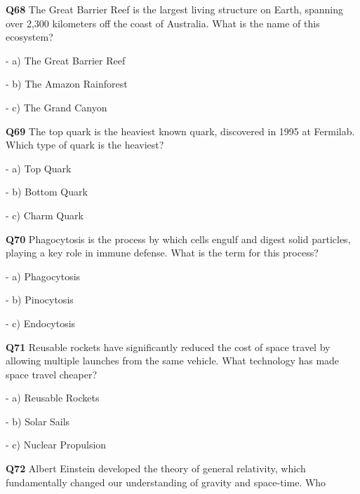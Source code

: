\textbf{Q68} The Great Barrier Reef is the largest living structure on Earth, spanning over 2,300 kilometers off the coast of Australia. What is the name of this ecosystem?\par
\quad - a) The Great Barrier Reef\par
\quad - b) The Amazon Rainforest\par
\quad - c) The Grand Canyon\par

\textbf{Q69} The top quark is the heaviest known quark, discovered in 1995 at Fermilab. Which type of quark is the heaviest?\par
\quad - a) Top Quark\par
\quad - b) Bottom Quark\par
\quad - c) Charm Quark\par

\textbf{Q70} Phagocytosis is the process by which cells engulf and digest solid particles, playing a key role in immune defense. What is the term for this process?\par
\quad - a) Phagocytosis\par
\quad - b) Pinocytosis\par
\quad - c) Endocytosis\par

\textbf{Q71} Reusable rockets have significantly reduced the cost of space travel by allowing multiple launches from the same vehicle. What technology has made space travel cheaper?\par
\quad - a) Reusable Rockets\par
\quad - b) Solar Sails\par
\quad - c) Nuclear Propulsion\par

\textbf{Q72} Albert Einstein developed the theory of general relativity, which fundamentally changed our understanding of gravity and space-time. Who developed this theory?\par
\quad - a) Galileo Galilei\par
\quad - b) Albert Einstein\par
\quad - c) Isaac Newton\par

\textbf{Q73} Drag is the force that opposes the motion of an object through a fluid, such as air or water. What is the term for this force?\par
\quad - a) Friction\par
\quad - b) Drag\par
\quad - c) Gravity\par

